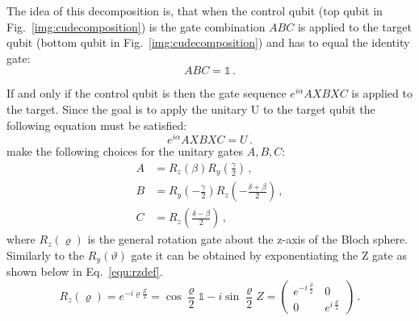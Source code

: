 
The idea of this decomposition is, that when the control qubit (top qubit in Fig.~\ref{img:cudecomposition}) is \0 the gate combination $ABC$ is applied to the target qubit (bottom qubit in Fig.~\ref{img:cudecomposition}) and has to equal the identity gate:
\begin{equation}
\label{equ:abcidentity}
ABC = \mathbb{1}\, .
\end{equation}

If and only if the control qubit is \1 then the gate sequence $e^{i\alpha}AXBXC$ is applied to the target. Since the goal is to apply the unitary U to the target qubit the following equation must be satisfied:
\begin{equation}
\label{equ:UAXBXC}
e^{i\alpha}AXBXC = U\, .
\end{equation}
 make the following choices for the unitary gates $A,B,C$:
\begin{align}\label{equ:abc}
A &=  R_z(\beta)R_y(\frac{\gamma}{2})\, ,\\
B &= R_y(-\frac{\gamma}{2})R_z(-\frac{\delta+\beta}{2})\, ,\\
C &= R_z(\frac{\delta-\beta}{2})\, ,
\end{align}
where $R_z(\varrho)$ is the general rotation gate about the z-axis of the Bloch sphere. Similarly to the $R_y(\vartheta)$ gate it can be obtained by exponentiating the Z gate as shown below in Eq.~\ref{equ:rzdef}.
\begin{equation}
\label{equ:rzdef}
R_z(\varrho) = e^{-i\varrho\frac{Z}{2}} = \cos\frac{\varrho}{2} \mathbb{1}- i\sin\frac{\varrho}{2}Z = \begin{pmatrix}
e^{-i\frac{\varrho}{2}} & 0 \\
0 & e^{i\frac{\varrho}{2}}
\end{pmatrix}\, .
\end{equation}

